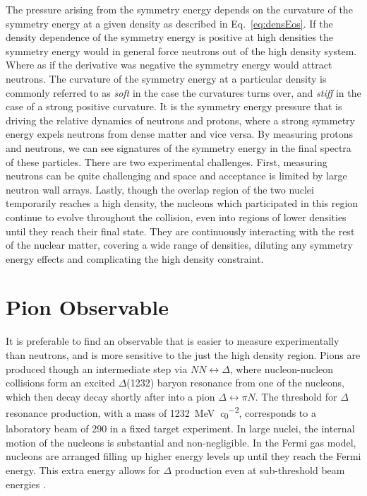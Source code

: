 The pressure arising from the symmetry energy depends on the curvature of the symmetry energy at a given density as described in Eq.~\ref{eq:densEos}. If the density dependence of the symmetry energy is positive at high densities the symmetry energy would in general force neutrons out of the high density system. Where as if the derivative was negative the symmetry energy would attract neutrons. The curvature of the symmetry energy at a particular density is commonly referred to as \emph{soft} in the case the curvatures turns over, and \emph{stiff} in the case of a strong positive curvature. It is the symmetry energy pressure that is driving the relative dynamics of neutrons and protons, where a strong symmetry energy expels neutrons from dense matter and vice versa. By measuring protons and neutrons, we can see signatures of the symmetry energy in the final spectra of these particles. There are two experimental challenges. First,  measuring neutrons can be quite challenging and space and acceptance is limited by large neutron wall arrays. Lastly, though the overlap region of the two nuclei temporarily reaches a high density, the nucleons which participated in this region continue to evolve throughout the collision, even into regions of lower densities until they reach their final state. They are continuously interacting with the rest of the nuclear matter, covering a wide range of densities, diluting any symmetry energy effects and complicating the high density constraint.   




\section{Pion Observable}
\label{sec:pionObs}
It is preferable to find an observable that is easier to measure experimentally than neutrons, and is more sensitive to the just the high density region. Pions are produced though an intermediate step via $ NN \leftrightarrow \Delta$, where nucleon-nucleon collisions form an excited $\Delta$(1232) baryon resonance from one of the nucleons, which then decay decay shortly after into a pion $\Delta \leftrightarrow \pi N$. The threshold for $\Delta$ resonance production, with a mass of \SI{1232}{\mega\electronvolt\per\clight\squared}, corresponds to a laboratory beam of \SI{290}{\MeVA} in a fixed target experiment. In large nuclei, the internal motion of the nucleons is substantial and non-negligible. In the Fermi gas model, nucleons are arranged filling up higher energy levels up until they reach the Fermi energy. This extra energy allows for $\Delta$ production even at sub-threshold beam energies \cite{fermiEnergy}.


